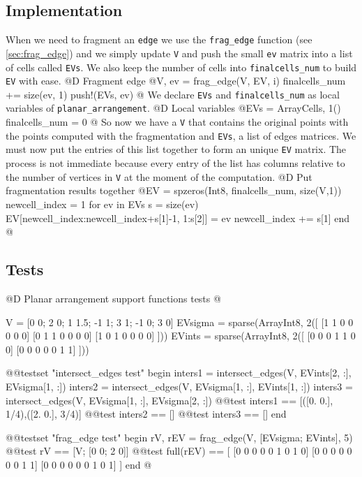 \documentclass[10pt]{book}
\begin{document}
\subsection{Implementation}
When we need to fragment an \texttt{edge} we use the \texttt{frag\_edge} function (see \ref{sec:frag_edge}) 
and we simply update \texttt{V} and push the small \texttt{ev} matrix into a list of cells called \texttt{EVs}.
We also keep the number of cells into \texttt{finalcells\_num} to build \texttt{EV} with ease.
@D Fragment edge
@{V, ev = frag_edge(V, EV, i)
finalcells_num += size(ev, 1)
push!(EVs, ev)
@}
We declare \texttt{EVs} and \texttt{finalcells\_num} as local variables of \texttt{planar\_arrangement}.
@D Local variables
@{EVs = Array{Cells, 1}()
finalcells_num = 0
@}
So now we have a \texttt{V} that contains the original points with the points computed with the fragmentation
and \texttt{EVs}, a list of edges matrices. We must now put the entries of this list together to form an unique
\texttt{EV} matrix. The process is not immediate because every entry of the list has columns relative to the 
number of vertices in \texttt{V} at the moment of the computation.
@D Put fragmentation results together
@{EV = spzeros(Int8, finalcells_num, size(V,1))
newcell_index = 1
for ev in EVs
    s = size(ev)
    EV[newcell_index:newcell_index+s[1]-1, 1:s[2]] = ev
    newcell_index += s[1]
end
@}
\subsection{Tests}
@D Planar arrangement support functions tests
@{V = [0 0; 2 0; 1 1.5; -1 1; 3 1; -1 0; 3 0]
EVsigma = sparse(Array{Int8, 2}([
    [1 1 0 0 0 0 0]
    [0 1 1 0 0 0 0]
    [1 0 1 0 0 0 0]
]))
EVints = sparse(Array{Int8, 2}([
    [0 0 0 1 1 0 0]
    [0 0 0 0 0 1 1]
]))

@@testset "intersect_edges test" begin
    inters1 = intersect_edges(V, EVints[2, :], EVsigma[1, :])
    inters2 = intersect_edges(V, EVsigma[1, :], EVints[1, :])
    inters3 = intersect_edges(V, EVsigma[1, :], EVsigma[2, :])
    @@test inters1 == [([0. 0.], 1/4),([2. 0.], 3/4)]
    @@test inters2 == []
    @@test inters3 == []
end

@@testset "frag_edge test" begin
    rV, rEV = frag_edge(V, [EVsigma; EVints], 5)
    @@test rV == [V; [0 0; 2 0]]
    @@test full(rEV) == [
        [0 0 0 0 0 1 0 1 0]
        [0 0 0 0 0 0 0 1 1]
        [0 0 0 0 0 0 1 0 1]
    ]
end
@}
\end{document}

